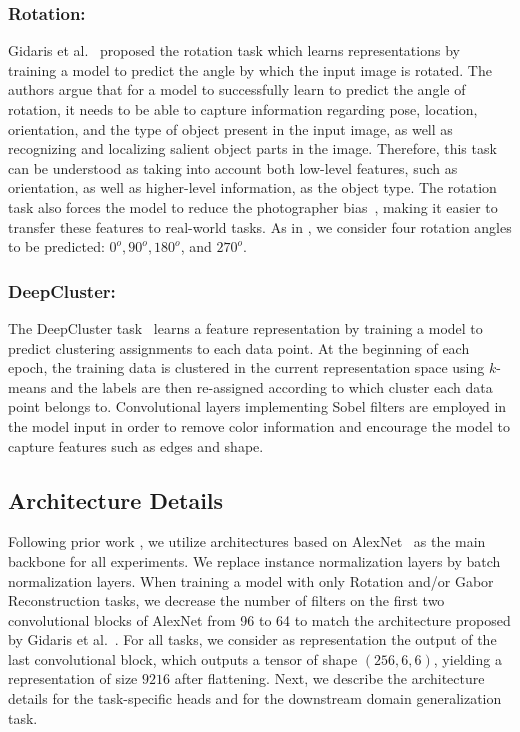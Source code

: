 \documentclass[runningheads]{llncs}
\begin{document}
\vspace{-5pt}\subsubsection{Rotation:} Gidaris et al.~\cite{gidaris2018unsupervised} proposed the rotation task which learns representations by training a model to predict the angle by which the input image is rotated. The authors argue that for a model to successfully learn to predict the angle of rotation, it needs to be able to capture information regarding pose, location, orientation, and the type of object present in the input image, as well as recognizing and localizing salient object parts in the image. Therefore, this task can be understood as taking into account both low-level features, such as orientation, as well as higher-level information, as the object type. 
The rotation task also forces the model to reduce the photographer bias~\cite{feng2019self}, making it easier to transfer these features to real-world tasks. 
As in \cite{gidaris2018unsupervised}, we consider four rotation angles to be predicted: $0^o, 90^o, 180^o$, and $270^o$.

\vspace{-5pt}\subsubsection{DeepCluster:}
The DeepCluster task~\cite{caron2018deep} learns a feature representation by training a model to predict clustering assignments to each data point. At the beginning of each epoch, the training data is clustered in the current representation space using $k$-means and the labels are then re-assigned according to which cluster each data point belongs to. Convolutional layers implementing Sobel filters are employed in the model input in order to remove color information and encourage the model to capture features such as edges and shape.  

\subsection{Architecture Details}\label{sec:arch}
Following prior work \cite{li2017deeper,li2018domain,carlucci2019domain,caron2018deep,gidaris2018unsupervised}, we utilize architectures based on AlexNet~\cite{krizhevsky2012imagenet} as the main backbone for all experiments. We replace instance normalization layers by batch normalization layers. When training a model with only Rotation and/or Gabor Reconstruction tasks, we decrease the number of filters on the first two convolutional blocks of AlexNet from 96 to 64 to match the architecture proposed by Gidaris et al.~\cite{gidaris2018unsupervised}. For all tasks, we consider as representation the output of the last convolutional block, which outputs a tensor of shape $(256, 6, 6)$, yielding a representation of size $9216$ after flattening. Next, we describe the architecture details for the task-specific heads and for the downstream domain generalization task.
\end{document}
